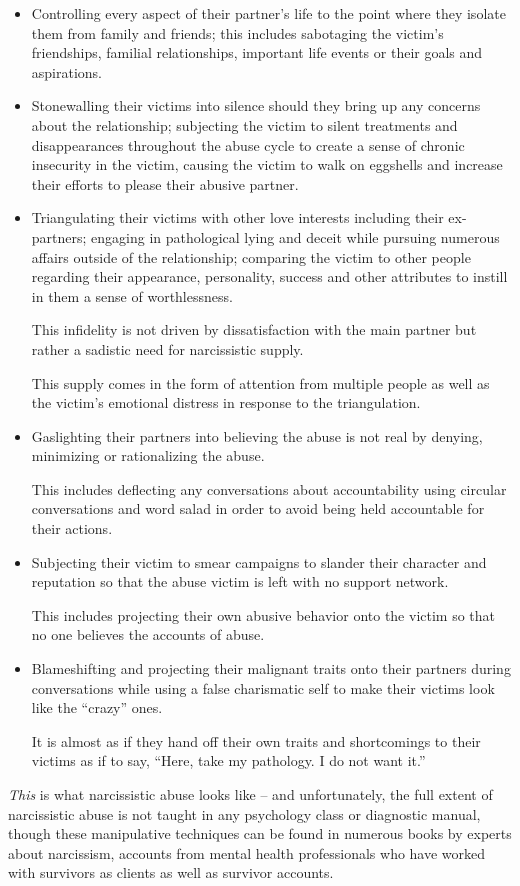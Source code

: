 \documentclass[oneside]{book}
\numberwithin{equation}{section}
\begin{document}
\begin{itemize}
    The victim is later discarded in a humiliating, demeaning manner, often followed by a smear campaign so that the narcissist feels that they have ``won'' the break-up.
    \item Controlling every aspect of their partner's life to the point where they isolate them from family and friends; this includes sabotaging the victim's friendships, familial relationships, important life events or their goals and aspirations.
    \item Stonewalling their victims into silence should they bring up any concerns about the relationship; subjecting the victim to silent treatments and disappearances throughout the abuse cycle to create a sense of chronic insecurity in the victim, causing the victim to walk on eggshells and increase their efforts to please their abusive partner.
    \item Triangulating their victims with other love interests including their ex-partners; engaging in pathological lying and deceit while pursuing numerous affairs outside of the relationship; comparing the victim to other people regarding their appearance, personality, success and other attributes to instill in them a sense of worthlessness.
    
    This infidelity is not driven by dissatisfaction with the main partner but rather a sadistic need for narcissistic supply.
    
    This supply comes in the form of attention from multiple people as well as the victim's emotional distress in response to the triangulation.
    \item Gaslighting their partners into believing the abuse is not real by denying, minimizing or rationalizing the abuse.
    
    This includes deflecting any conversations about accountability using circular conversations and word salad in order to avoid being held accountable for their actions.
    \item Subjecting their victim to smear campaigns to slander their character and reputation so that the abuse victim is left with no support network.
    
    This includes projecting their own abusive behavior onto the victim so that no one believes the accounts of abuse.
    \item Blameshifting and projecting their malignant traits onto their partners during conversations while using a false charismatic self to make their victims look like the ``crazy'' ones.
    
    It is almost as if they hand off their own traits and shortcomings to their victims as if to say, ``Here, take my pathology. I do not want it.''
\end{itemize}
\textit{This} is what narcissistic abuse looks like -- and unfortunately, the full extent of narcissistic abuse is not taught in any psychology class or diagnostic manual, though these manipulative techniques can be found in numerous books by experts about narcissism, accounts from mental health professionals who have worked with survivors as clients as well as survivor accounts.
\end{document}
